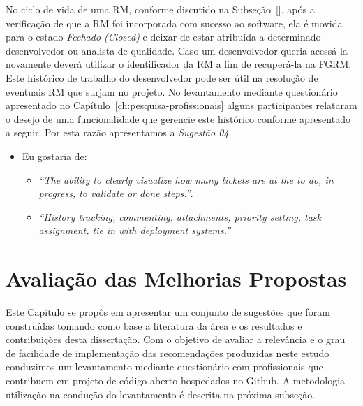 
No ciclo de vida de uma RM, conforme discutido na Subseção~\ref{}, após a
verificação de que a RM foi incorporada com sucesso ao software, ela é movida
para o estado \textit{Fechado (Closed)} e deixar de estar atribuída a
determinado desenvolvedor ou analista de qualidade. Caso um desenvolvedor queria
acessá-la novamente deverá utilizar o identificador da RM a fim de recuperá-la
na FGRM\@. Este histórico de trabalho do desenvolvedor pode ser útil na resolução
de eventuais RM que surjam no projeto. No levantamento mediante questionário
apresentado no Capítulo~\ref{ch:pesquisa-profissionais} alguns participantes
relataram o desejo de uma funcionalidade  que gerencie este histórico conforme
apresentado a seguir. Por esta razão apresentamos a \textit{Sugestão 04}.

\begin{itemize}
	\item Eu gostaria de:
	\begin{itemize}
		\item \textit{``The ability to clearly visualize how many tickets are at
				the to do, in progress, to validate or done steps.''}.
		\item \textit{``History tracking, commenting, attachments, priority
				setting, task assignment, tie in with deployment systems.''}
	\end{itemize}
\end{itemize}


\section{Avaliação das Melhorias Propostas}
\label{sec:sug_melhoria_avaliacao_das_melhorias}

Este Capítulo se propôs em apresentar um conjunto de sugestões que foram
construídas tomando como base a literatura da área e os resultados e
contribuições desta dissertação. Com o objetivo de avaliar a relevância e o grau
de facilidade de implementação das recomendações produzidas neste estudo
conduzimos um levantamento mediante questionário com profissionais que
contribuem em projeto de código aberto hospedados no Github. A metodologia
utilização na condução do levantamento é descrita na próxima subseção.

